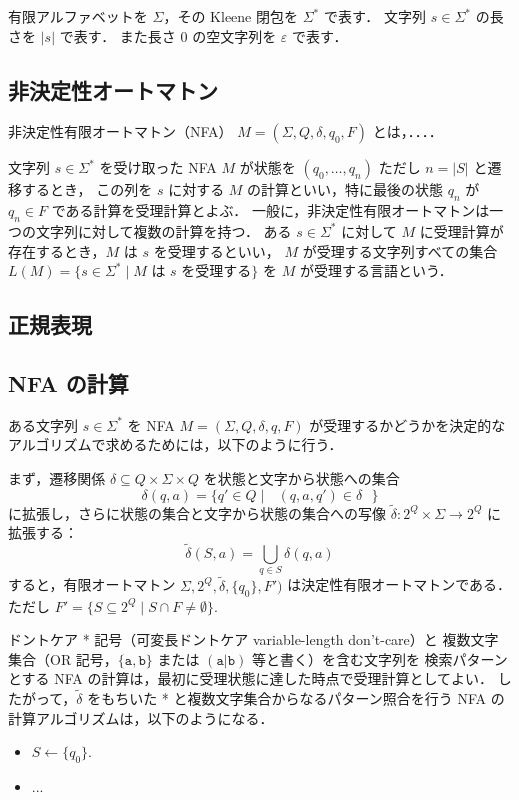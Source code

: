 \documentclass[11pt]{jreport}
\begin{document}
有限アルファベットを $\Sigma$，その Kleene 閉包を $\Sigma^*$ で表す．
文字列 $s\in \Sigma^*$ の長さを $|s|$ で表す．
また長さ $0$ の空文字列を $\varepsilon$ で表す．

\subsection*{非決定性オートマトン}

\begin{defn}
非決定性有限オートマトン（NFA） $M = (\Sigma, Q, \delta, q_0, F)$ とは，．．．．

\vspace{2cm}

文字列 $s \in \Sigma^*$ を受け取った NFA $M$ が状態を $(q_0, \ldots, q_n)$ ただし $n = |S|$ と遷移するとき，
この列を $s$ に対する $M$ の計算といい，特に最後の状態 $q_n$ が $q_n \in F$ である計算を受理計算とよぶ．
一般に，非決定性有限オートマトンは一つの文字列に対して複数の計算を持つ．
ある $s\in\Sigma^*$ に対して $M$ に受理計算が存在するとき，$M$ は $s$ を受理するといい，
$M$ が受理する文字列すべての集合 $L(M) = \{ s \in \Sigma^* \mid \mbox{$M$ は $s$ を受理する}\}$ を $M$ が受理する言語という．
\end{defn}

\subsection*{正規表現}

\subsection*{NFA の計算}

ある文字列 $s\in\Sigma^*$ を NFA $M = (\Sigma, Q, \delta, q, F)$ が受理するかどうかを決定的なアルゴリズムで求めるためには，以下のように行う．

まず，遷移関係 $\delta \subseteq Q \times \Sigma \times Q$ を状態と文字から状態への集合 
\[
\delta(q, a) = \{q' \in Q \mid \mbox{ $(q, a, q') \in \delta$ }\}
\]
に拡張し，さらに状態の集合と文字から状態の集合への写像 $\tilde\delta: 2^Q \times \Sigma \to 2^Q$ に拡張する：
\[
\tilde\delta(S, a) = \bigcup_{q \in S} \delta(q, a)
\]
すると，有限オートマトン $\Sigma, 2^Q, \tilde\delta, \{q_0\}, F')$ は決定性有限オートマトンである．
ただし $F' = \{ S \subseteq 2^Q \mid S\cap F \neq \emptyset\}$. 


ドントケア * 記号（可変長ドントケア variable-length don't-care）と
複数文字集合（OR 記号，$\{\mathtt{a}, \mathtt{b}\}$ または $\mathtt{(a|b)}$ 等と書く）を含む文字列を
検索パターンとする NFA の計算は，最初に受理状態に達した時点で受理計算としてよい．
したがって，$\tilde\delta$ をもちいた
 * と複数文字集合からなるパターン照合を行う NFA の計算アルゴリズムは，以下のようになる．
 \begin{itemize}
 \item $S \leftarrow \{q_0\}$.
 \item ...
 \end{itemize}
\end{document}
